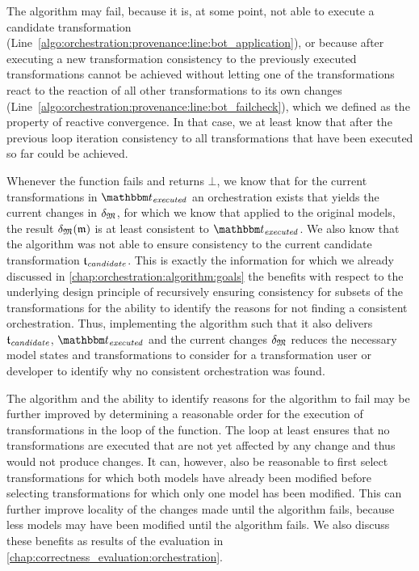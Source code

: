 The algorithm may fail, because it is, at some point, not able to execute a candidate transformation (Line~\ref{algo:orchestration:provenance:line:bot_application}), or because after executing a new transformation consistency to the previously executed transformations cannot be achieved without letting one of the transformations react to the reaction of all other transformations to its own changes (Line~\ref{algo:orchestration:provenance:line:bot_failcheck}), which we defined as the property of reactive convergence.
In that case, we at least know that after the previous loop iteration consistency to all transformations that have been executed so far could be achieved.

Whenever the  function fails and returns $\bot$, we know that for the current transformations in $\provalgexecuted$ an orchestration exists that yields the current changes in $\changetuple{\metamodeltuple{M}}$, %
for which we know that applied to the original models, the result $\changetuple{\metamodeltuple{M}}(\modeltuple{m})$ %
is at least consistent to $\provalgexecuted$.
We also know that the algorithm was not able to ensure consistency to the current candidate transformation $\provalgcandidate$.
This is exactly the information for which we already discussed in \autoref{chap:orchestration:algorithm:goals} the benefits with respect to the underlying design principle of recursively ensuring consistency for subsets of the transformations for the ability to identify the reasons for not finding a consistent orchestration.
Thus, implementing the algorithm such that it also delivers $\provalgcandidate$, $\provalgexecuted$ and the current changes $\changetuple{\metamodeltuple{M}}$ reduces the necessary model states and transformations to consider for a transformation user or developer to identify why no consistent orchestration was found.


The algorithm and the ability to identify reasons for the algorithm to fail may be further improved by determining a reasonable order for the execution of transformations in the loop of the  function.
The loop at least ensures that no transformations are executed that are not yet affected by any change and thus would not produce changes.
It can, however, also be reasonable to first select transformations for which both models have already been modified before selecting transformations for which only one model has been modified.
This can further improve locality of the changes made until the algorithm fails, because less models may have been modified until the algorithm fails.
We also discuss these benefits as results of the evaluation in \autoref{chap:correctness_evaluation:orchestration}.



